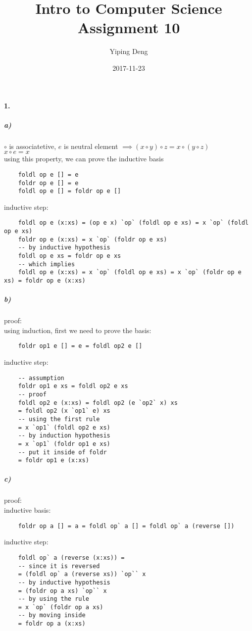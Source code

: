 \documentclass{article}
\title{Intro to Computer Science Assignment 10}
\date{2017-11-23}
\author{Yiping Deng}
\begin{document}
\maketitle
\paragraph{1.}
\subparagraph{a)} $\circ$ is associatetive, $e$ is neutral element $\implies (x \circ y) \circ z = x \circ (y \circ z)$ \\
$x \circ e = x$ \\
using this property, we can prove the inductive basis\\
\begin{verbatim}
    foldl op e [] = e
    foldr op e [] = e
    foldl op e [] = foldr op e []
\end{verbatim}
inductive step:\\
\begin{verbatim}
    foldl op e (x:xs) = (op e x) `op` (foldl op e xs) = x `op` (foldl op e xs)
    foldr op e (x:xs) = x `op` (foldr op e xs)
    -- by inductive hypothesis
    foldl op e xs = foldr op e xs
    -- which implies
    foldl op e (x:xs) = x `op` (foldl op e xs) = x `op` (foldr op e xs) = foldr op e (x:xs)
\end{verbatim}

\subparagraph{b)} proof: \\
using induction, first we need to prove the basis: \\
\begin{verbatim}
    foldr op1 e [] = e = foldl op2 e []
\end{verbatim}
inductive step: \\
\begin{verbatim}
    -- assumption
    foldr op1 e xs = foldl op2 e xs
    -- proof
    foldl op2 e (x:xs) = foldl op2 (e `op2` x) xs
    = foldl op2 (x `op1` e) xs
    -- using the first rule
    = x `op1` (foldl op2 e xs)
    -- by induction hypothesis
    = x `op1` (foldr op1 e xs)
    -- put it inside of foldr
    = foldr op1 e (x:xs)
\end{verbatim}
\subparagraph{c)} proof: \\
inductive basis:\\
\begin{verbatim}
    foldr op a [] = a = foldl op` a [] = foldl op` a (reverse [])
\end{verbatim}
inductive step:
\begin{verbatim}
    foldl op` a (reverse (x:xs)) =
    -- since it is reversed
    = (foldl op` a (reverse xs)) `op`` x
    -- by inductive hypothesis
    = (foldr op a xs) `op`` x
    -- by using the rule
    = x `op` (foldr op a xs)
    -- by moving inside
    = foldr op a (x:xs)
\end{verbatim}
\end{document}

